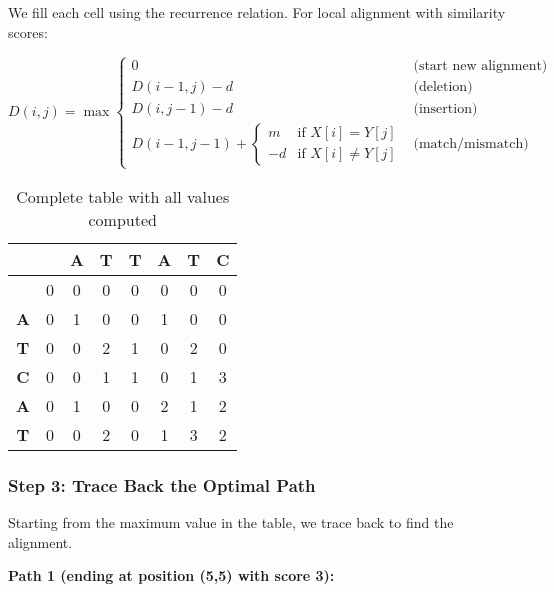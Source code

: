 \documentclass[11pt,a4paper]{article}
\theoremstyle{definition}
\theoremstyle{plain}
\theoremstyle{remark}
\begin{document}
We fill each cell using the recurrence relation. For local alignment with similarity scores:

\[
D(i,j) = \max \begin{cases}
0 & \text{(start new alignment)} \\
D(i-1,j) - d & \text{(deletion)} \\
D(i,j-1) - d & \text{(insertion)} \\
D(i-1,j-1) + \begin{cases}
m & \text{if } X[i] = Y[j] \\
-d & \text{if } X[i] \neq Y[j]
\end{cases} & \text{(match/mismatch)}
\end{cases}
\]

\begin{table}[h]
\centering
\begin{tabular}{|c|c|c|c|c|c|c|c|}
\hline
 & & \textbf{A} & \textbf{T} & \textbf{T} & \textbf{A} & \textbf{T} & \textbf{C} \\
\hline
 & 0 & 0 & 0 & 0 & 0 & 0 & 0 \\
\hline
\textbf{A} & 0 & 1 & 0 & 0 & 1 & 0 & 0 \\
\hline
\textbf{T} & 0 & 0 & 2 & 1 & 0 & 2 & 0 \\
\hline
\textbf{C} & 0 & 0 & 1 & 1 & 0 & 1 & 3 \\
\hline
\textbf{A} & 0 & 1 & 0 & 0 & 2 & 1 & 2 \\
\hline
\textbf{T} & 0 & 0 & 2 & 0 & 1 & 3 & 2 \\
\hline
\end{tabular}
\caption{Complete table with all values computed}
\end{table}

\subsubsection{Step 3: Trace Back the Optimal Path}

Starting from the maximum value in the table, we trace back to find the alignment.

\textbf{Path 1 (ending at position (5,5) with score 3):}
\end{document}
